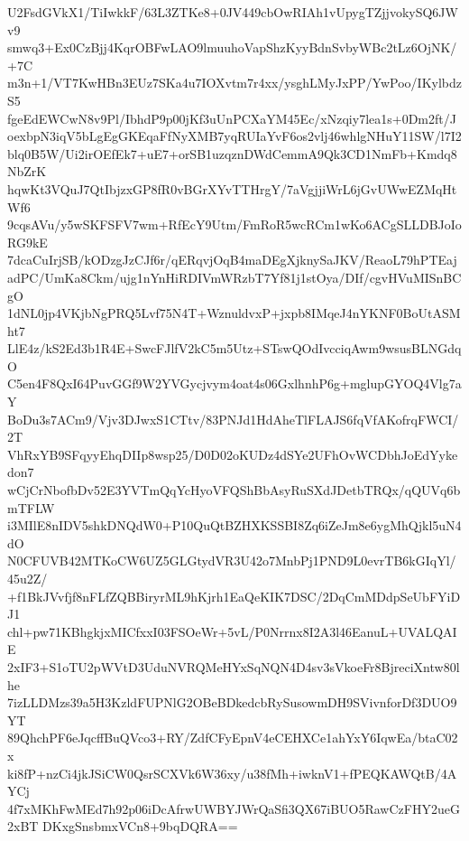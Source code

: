 U2FsdGVkX1/TiIwkkF/63L3ZTKe8+0JV449cbOwRIAh1vUpygTZjjvokySQ6JWv9
smwq3+Ex0CzBjj4KqrOBFwLAO9lmuuhoVapShzKyyBdnSvbyWBc2tLz6OjNK/+7C
m3n+1/VT7KwHBn3EUz7SKa4u7IOXvtm7r4xx/ysghLMyJxPP/YwPoo/IKylbdzS5
fgeEdEWCwN8v9Pl/IbhdP9p00jKf3uUnPCXaYM45Ec/xNzqiy7lea1s+0Dm2ft/J
oexbpN3iqV5bLgEgGKEqaFfNyXMB7yqRUIaYvF6os2vlj46whlgNHuY11SW/l7I2
blq0B5W/Ui2irOEfEk7+uE7+orSB1uzqznDWdCemmA9Qk3CD1NmFb+Kmdq8NbZrK
hqwKt3VQuJ7QtIbjzxGP8fR0vBGrXYvTTHrgY/7aVgjjiWrL6jGvUWwEZMqHtWf6
9cqsAVu/y5wSKFSFV7wm+RfEcY9Utm/FmRoR5wcRCm1wKo6ACgSLLDBJoIoRG9kE
7dcaCuIrjSB/kODzgJzCJf6r/qERqvjOqB4maDEgXjknySaJKV/ReaoL79hPTEaj
adPC/UmKa8Ckm/ujg1nYnHiRDIVmWRzbT7Yf81j1stOya/DIf/cgvHVuMISnBCgO
1dNL0jp4VKjbNgPRQ5Lvf75N4T+WznuldvxP+jxpb8IMqeJ4nYKNF0BoUtASMht7
LlE4z/kS2Ed3b1R4E+SwcFJlfV2kC5m5Utz+STswQOdIvcciqAwm9wsusBLNGdqO
C5en4F8QxI64PuvGGf9W2YVGycjvym4oat4s06GxlhnhP6g+mglupGYOQ4Vlg7aY
BoDu3s7ACm9/Vjv3DJwxS1CTtv/83PNJd1HdAheTlFLAJS6fqVfAKofrqFWCI/2T
VhRxYB9SFqyyEhqDIIp8wsp25/D0D02oKUDz4dSYe2UFhOvWCDbhJoEdYykedon7
wCjCrNbofbDv52E3YVTmQqYcHyoVFQShBbAsyRuSXdJDetbTRQx/qQUVq6bmTFLW
i3MIlE8nIDV5shkDNQdW0+P10QuQtBZHXKSSBI8Zq6iZeJm8e6ygMhQjkl5uN4dO
N0CFUVB42MTKoCW6UZ5GLGtydVR3U42o7MnbPj1PND9L0evrTB6kGIqYl/45u2Z/
+f1BkJVvfjf8nFLfZQBBiryrML9hKjrh1EaQeKIK7DSC/2DqCmMDdpSeUbFYiDJ1
chl+pw71KBhgkjxMICfxxI03FSOeWr+5vL/P0Nrrnx8I2A3l46EanuL+UVALQAIE
2xIF3+S1oTU2pWVtD3UduNVRQMeHYxSqNQN4D4sv3sVkoeFr8BjreciXntw80lhe
7izLLDMzs39a5H3KzldFUPNlG2OBeBDkedcbRySusowmDH9SVivnforDf3DUO9YT
89QhchPF6eJqcffBuQVco3+RY/ZdfCFyEpnV4eCEHXCe1ahYxY6IqwEa/btaC02x
ki8fP+nzCi4jkJSiCW0QsrSCXVk6W36xy/u38fMh+iwknV1+fPEQKAWQtB/4AYCj
4f7xMKhFwMEd7h92p06iDcAfrwUWBYJWrQaSfi3QX67iBUO5RawCzFHY2ueG2xBT
DKxgSnsbmxVCn8+9bqDQRA==
